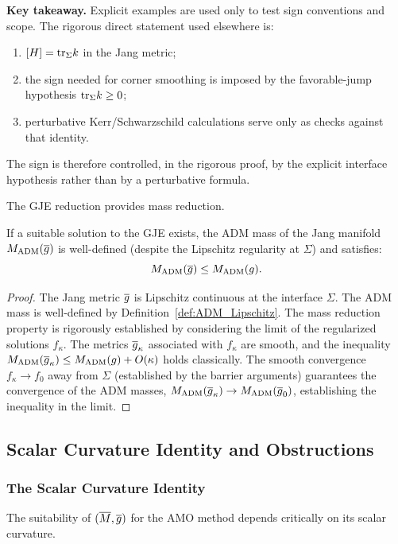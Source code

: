 \begin{remark}
\textbf{Key takeaway.} Explicit examples are used only to test sign conventions and scope. The rigorous direct statement used elsewhere is:
\begin{enumerate}
    \item $[H] = \mathrm{tr}_\Sigma k$ in the Jang metric;
    \item the sign needed for corner smoothing is imposed by the favorable-jump hypothesis $\mathrm{tr}_\Sigma k \ge 0$;
    \item perturbative Kerr/Schwarzschild calculations serve only as checks against that identity.
\end{enumerate}
The sign is therefore controlled, in the rigorous proof, by the explicit interface hypothesis rather than by a perturbative formula.
\end{remark}

The GJE reduction provides mass reduction.

\begin{theorem}\label{thm:MassReductionGJE}
If a suitable solution to the GJE exists, the ADM mass of the Jang manifold $M_{\mathrm{ADM}}(\overline{g})$ is well-defined (despite the Lipschitz regularity at $\Sigma$) and satisfies:
\begin{equation}
    M_{\mathrm{ADM}}(\overline{g}) \le M_{\mathrm{ADM}}(g).
\end{equation}
\end{theorem}
\begin{proof}
The Jang metric $\overline{g}$ is Lipschitz continuous at the interface $\Sigma$. The ADM mass is well-defined by Definition~\ref{def:ADM_Lipschitz}. The mass reduction property is rigorously established by considering the limit of the regularized solutions $f_\kappa$. The metrics $\overline{g}_\kappa$ associated with $f_\kappa$ are smooth, and the inequality $M_{\mathrm{ADM}}(\overline{g}_\kappa) \le M_{\mathrm{ADM}}(g) + O(\kappa)$ holds classically. The smooth convergence $f_\kappa \to f_0$ away from $\Sigma$ (established by the barrier arguments) guarantees the convergence of the ADM masses, $M_{\mathrm{ADM}}(\overline{g}_\kappa) \to M_{\mathrm{ADM}}(\overline{g}_0)$, establishing the inequality in the limit.
\end{proof}

\subsection{Scalar Curvature Identity and Obstructions}

\subsubsection{The Scalar Curvature Identity}
The suitability of $(\overline{M}, \overline{g})$ for the AMO method depends critically on its scalar curvature.

